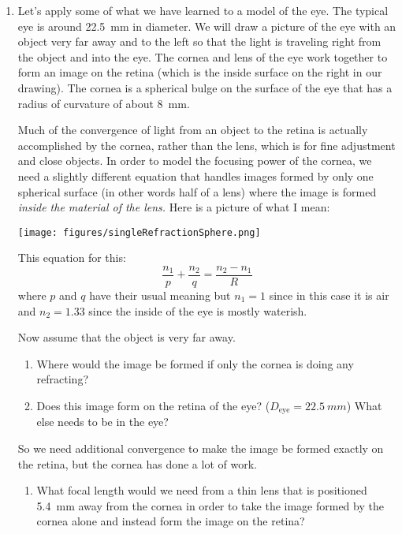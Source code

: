 \begin{enumerate}
\newpage
\item
Let's apply some of what we have learned to a model of the eye. The typical eye is around \SI{22.5}{mm} in diameter. We will draw a picture of the eye with an object very far away and to the left so that the light is traveling right from the object and into the eye. The cornea and lens of the eye work together to form an image on the retina (which is the inside surface on the right in our drawing). The cornea is a spherical bulge on the surface of the eye that has a radius of curvature of about \SI{8}{mm}. 

\vspace{5cm}

Much of the convergence of light from an object to the retina is actually accomplished by the cornea, rather than the lens, which is for fine adjustment and close objects. In order to model the focusing power of the cornea, we need a slightly different equation that handles images formed by only one spherical surface (in other words half of a lens) where the image is formed \emph{inside the material of the lens.} Here is a picture of what I mean:

\texttt{[image: figures/singleRefractionSphere.png]}

This equation for this:
\[\frac{n_1}{p}+\frac{n_2}{q}=\frac{n_2-n_1}{R}\]
where $p$ and $q$ have their usual meaning but $n_1=1$ since in this case it is air and $n_2=1.33$ since the inside of the eye is mostly waterish. 

Now assume that the object is very far away.
\begin{enumerate}
\setlength\itemsep{2 in}
\item Where would the image be formed if only the cornea is doing any refracting?
\item Does this image form on the retina of the eye? ($D_{\text{eye}}=\SI{22.5}{mm}$) What else needs to be in the eye?
\setcounter{saveenum}{\value{enumii}}
\end{enumerate}\bigskip

So we need additional convergence to make the image be formed exactly on the retina, but the cornea has done a lot of work. 

\begin{enumerate}
\setcounter{enumii}{\value{saveenum}}
\setlength\itemsep{2 in}
\item What focal length would we need from a thin lens that is positioned \SI{5.4}{mm} away from the cornea in order to take the image formed by the cornea alone and instead form the image on the retina?
\setcounter{saveenum}{\value{enumii}}
\end{enumerate}\bigskip


\end{enumerate}

